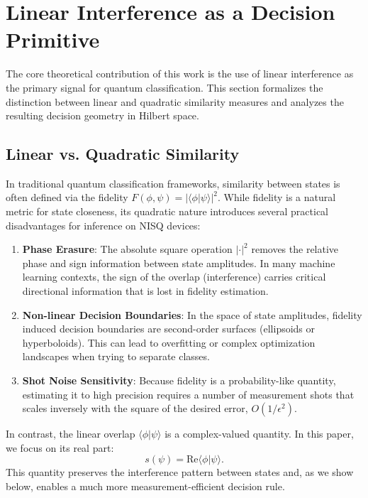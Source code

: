 \documentclass[conference]{IEEEtran}
\begin{document}
\section{Linear Interference as a Decision Primitive}

The core theoretical contribution of this work is the use of linear interference as the primary signal for quantum classification. This section formalizes the distinction between linear and quadratic similarity measures and analyzes the resulting decision geometry in Hilbert space.

\subsection{Linear vs. Quadratic Similarity}

In traditional quantum classification frameworks, similarity between states is often defined via the fidelity $F(\phi, \psi) = |\langle \phi | \psi \rangle|^2$. While fidelity is a natural metric for state closeness, its quadratic nature introduces several practical disadvantages for inference on NISQ devices:
\begin{enumerate}
    \item \textbf{Phase Erasure}: The absolute square operation $|\cdot|^2$ removes the relative phase and sign information between state amplitudes. In many machine learning contexts, the sign of the overlap (interference) carries critical directional information that is lost in fidelity estimation.
    \item \textbf{Non-linear Decision Boundaries}: In the space of state amplitudes, fidelity induced decision boundaries are second-order surfaces (ellipsoids or hyperboloids). This can lead to overfitting or complex optimization landscapes when trying to separate classes.
    \item \textbf{Shot Noise Sensitivity}: Because fidelity is a probability-like quantity, estimating it to high precision requires a number of measurement shots that scales inversely with the square of the desired error, $O(1/\epsilon^2)$.
\end{enumerate}

In contrast, the linear overlap $\langle \phi | \psi \rangle$ is a complex-valued quantity. In this paper, we focus on its real part:
\begin{equation}
s(\psi) = \mathrm{Re}\langle \phi | \psi \rangle.
\end{equation}
This quantity preserves the interference pattern between states and, as we show below, enables a much more measurement-efficient decision rule.
\end{document}
